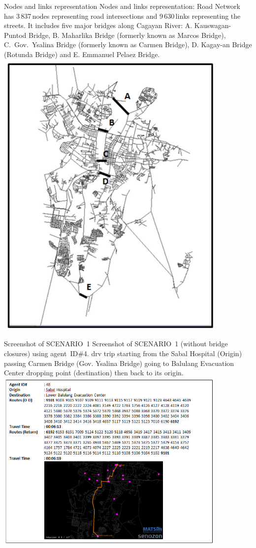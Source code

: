 \createfigure%
{Nodes and links representation}%
{Nodes and links representation: Road Network has 3\,837\,nodes representing road intersections and 9\,630\,links representing the streets. It includes five major bridges along Cagayan River: A. Kauswagan-Puntod Bridge, B. Maharlika Bridge (formerly known as Marcos Bridge), C.\ Gov.\ Ysalina Bridge (formerly known as Carmen Bridge), D. Kagay-an Bridge (Rotunda Bridge) and E. Emmanuel Pelaez Bridge.}%
{\label{fig:philippines_fig2}}%
{\includegraphics[width=0.85\textwidth, angle=0]{./scenarios/figures/philippines_fig2.png}}%
{}

\createfigure%
{Screenshot of SCENARIO~1}%
{Screenshot of SCENARIO~1 (without bridge closures) using agent~ID\#4. \protect\gls{drv} trip starting from the Sabal Hospital (Origin) passing Carmen Bridge (Gov. Ysalina Bridge) going to Balulang Evacuation Center dropping point (destination) then back to its origin.}%
{\label{fig:philippines_fig4}}%
{\includegraphics[width=0.85\textwidth, angle=0]{./scenarios/figures/philippines_fig4.png}}%
{}

